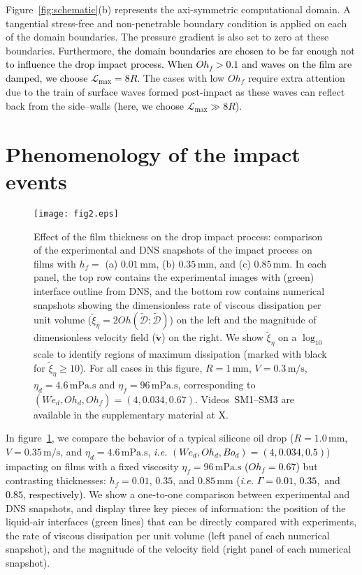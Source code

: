 \documentclass[]{jfm}
\newcommand*\red{\textcolor{black}}
\newcommand{\revRev}[1]{\textcolor{black}{#1}}
\newcommand{\Ohd}{\mathit{Oh}_\mathit{d}}
\newcommand{\Ohf}{\mathit{Oh}_\mathit{f}}
\newcommand{\Wen}{\mathit{We}_\mathit{d}}
\newcommand{\Bon}{\mathit{Bo}_\mathit{d}}
\begin{document}
	Figure~\ref{fig:schematic}(b) represents the axi-symmetric computational domain. A tangential stress-free and non-penetrable boundary condition is applied on each of the domain boundaries. The pressure gradient is also set to zero at these boundaries. Furthermore, \revRev{the domain boundaries are chosen to be far enough not to influence the drop impact process. When $Oh_f > 0.1$ and waves on the film are damped, we choose $\mathcal{L}_{\text{max}} = 8R$.} 
	The cases with low $\Ohf$ require extra attention due to the train of \revRev{surface} waves formed post-impact as these waves can reflect back from the side--walls \revRev{(here, we choose $\mathcal{L}_{\text{max}} \gg 8R$)}.
	
	\section{Phenomenology of the impact events} \label{sec:Phenomenology}
	
	\begin{figure}
		\centering
		\texttt{[image: fig2.eps]}
		\caption{Effect of the film thickness on the drop impact process: comparison of the experimental and DNS snapshots of the impact process on films with $h_f = $ (a) $0.01\,\si{\milli\meter}$, (b) $0.35\,\si{\milli\meter}$, and (c) $0.85\,\si{\milli\meter}$. In each panel, the top row contains the experimental images with (green) interface outline from DNS, and the bottom row contains numerical snapshots showing the dimensionless rate of viscous dissipation per unit volume ($\tilde{\xi}_\eta = 2Oh\left(\boldsymbol{\tilde{\mathcal{D}}:\tilde{\mathcal{D}}}\right)$) on the left and the magnitude of dimensionless velocity field ($\boldsymbol{\tilde{v}}$) on the right. We show $\tilde{\xi}_\eta$ on a $\log_{\text{10}}$ scale to identify regions of maximum dissipation (marked with black for $\tilde{\xi}_\eta \ge 10$). For all cases in this figure, $R = 1\,\si{\milli\meter}$, $V = 0.3\,\si{\meter}/\si{\second}$, $\eta_{d} = 4.6\,\si{\milli\pascal}.\si{\second}$ and $\eta_{f} = 96\,\si{\milli\pascal}.\si{\second}$, corresponding to $(\Wen, \Ohd, \Ohf) = (4, 0.034, 0.67)$. Videos~\red{SM1--SM3} are available in the supplementary material at \red{X}.}
		\label{fig:figure02}
	\end{figure}
	
	In figure~\ref{fig:figure02}, we compare the behavior of a typical silicone oil drop ($R = 1.0\,\si{\milli\meter}$, $V = 0.35\,\si{\meter}/\si{\second}$, and $\eta_d = 4.6\,\si{\milli\pascal}.\si{\second}$, \revRev{\emph{i.e.} $(\Wen, \Ohd, \Bon) = (4, 0.034, 0.5)$}) impacting on films with a fixed viscosity $\eta_f = 96\,\si{\milli\pascal}.\si{\second}$ \revRev{($\Ohf = 0.67$)} but contrasting thicknesses: $h_{f} = 0.01,\,0.35$, and $0.85\,\si{\milli\meter}$ \revRev{(\emph{i.e.} $\Gamma = 0.01,\,0.35,$ and $0.85$, respectively)}. We show a one-to-one comparison between experimental and DNS snapshots, and display three key pieces of information: the position of the liquid-air interfaces (green lines) that can be directly compared with experiments, the rate of viscous dissipation per unit volume (left panel of each numerical snapshot), and the magnitude of the velocity field (right panel of each numerical snapshot).
	
\end{document}
